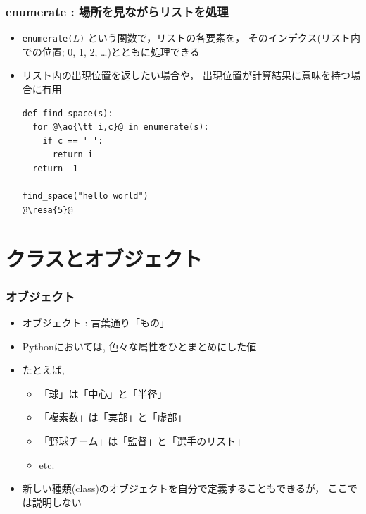 \documentclass[10pt,dvipdfmx]{beamer}
\newcommand{\ore}[1]{{\color{orange}#1}}
\newcommand{\ao}[1]{{\color{blue}#1}}
\newcommand{\resa}[1]{\ore{\textsl{$\rightarrow$ #1}}}
\begin{document}
\begin{frame}[fragile]
\frametitle{enumerate : 場所を見ながらリストを処理}
\begin{itemize}
\item \ao{\tt enumerate($L$)} という関数で，リストの各要素を，
そのインデクス(リスト内での位置; 0, 1, 2, \ldots)とともに処理できる
\item リスト内の出現位置を返したい場合や，
出現位置が計算結果に意味を持つ場合に有用
\begin{lstlisting}
def find_space(s):
  for @\ao{\tt i,c}@ in enumerate(s):
    if c == ' ':
      return i
  return -1

find_space("hello world")
@\resa{5}@
\end{lstlisting}
\end{itemize}
\end{frame}



\section{クラスとオブジェクト}
\begin{frame}
\frametitle{オブジェクト}
\begin{itemize}
\item オブジェクト : 言葉通り「もの」
\item Pythonにおいては, \ao{色々な属性をひとまとめにした値}
\item たとえば, 
  \begin{itemize}
  \item 「球」は「中心」と「半径」
  \item 「複素数」は「実部」と「虚部」
  \item 「野球チーム」は「監督」と「選手のリスト」
  \item etc.
  \end{itemize}
\item 新しい種類(class)のオブジェクトを自分で定義することもできるが，
ここでは説明しない
\end{itemize}
\end{frame}
\end{document}

